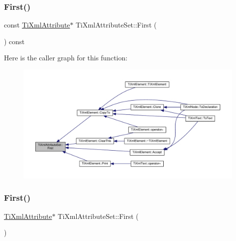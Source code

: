 \subsubsection{\texorpdfstring{First()}{First()}\hspace{0.1cm}{\footnotesize\ttfamily [1/2]}}
{\footnotesize\ttfamily const \hyperlink{class_ti_xml_attribute}{Ti\+Xml\+Attribute}$\ast$ Ti\+Xml\+Attribute\+Set\+::\+First (\begin{DoxyParamCaption}{ }\end{DoxyParamCaption}) const\hspace{0.3cm}{\ttfamily [inline]}}

Here is the caller graph for this function\+:\nopagebreak
\begin{figure}[H]
\begin{center}
\leavevmode
\includegraphics[width=350pt]{class_ti_xml_attribute_set_a85dfd2b5bae45c94334dced146f5c11a_icgraph}
\end{center}
\end{figure}
\mbox{\label{class_ti_xml_attribute_set_a99703bb08ca2aece2d7ef835de339ba0}} 
\subsubsection{\texorpdfstring{First()}{First()}\hspace{0.1cm}{\footnotesize\ttfamily [2/2]}}
{\footnotesize\ttfamily \hyperlink{class_ti_xml_attribute}{Ti\+Xml\+Attribute}$\ast$ Ti\+Xml\+Attribute\+Set\+::\+First (\begin{DoxyParamCaption}{ }\end{DoxyParamCaption})\hspace{0.3cm}{\ttfamily [inline]}}


